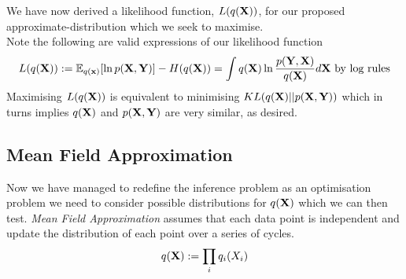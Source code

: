 \documentclass[11pt,a4paper]{article}
\begin{document}
We have now derived a likelihood function, $L(q(\textbf{X}))$, for our proposed approximate-distribution which we seek to maximise.\\
Note the following are valid expressions of our likelihood function
$$L(q(\textbf{X})):=\mathbb{E}_{q(\textbf{x})}[\ln p(\textbf{X},\textbf{Y})]-H(q(\textbf{X}))=\int q(\textbf{X})\ln\dfrac{p(\textbf{Y},\textbf{X})}{q(\textbf{X})}d\textbf{X}\text{ by log rules}$$
\nb Maximising $L(q(\textbf{X}))$ is equivalent to minimising $KL(q(\textbf{X})||p(\textbf{X},\textbf{Y}))$ which in turns implies $q(\textbf{X})$ and $p(\textbf{X},\textbf{Y})$ are very similar, as desired.

\subsection{Mean Field Approximation}

Now we have managed to redefine the inference problem as an optimisation problem we need to consider possible distributions for $q(\textbf{X})$ which we can then test. \textit{Mean Field Approximation} assumes that each data point is independent and update the distribution of each point over a series of cycles.
$$q(\textbf{X}):=\prod_iq_i(X_i)$$
\end{document}
